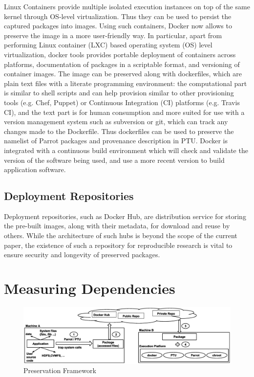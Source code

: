 Linux Containers provide multiple isolated execution instances on top of the same kernel through OS-level virtualization. Thus they can be used to persist the captured packages into images. Using such containers, Docker now allows to preserve the image in a more user-friendly way. In particular, apart from performing Linux container (LXC) based operating system (OS) level virtualization, docker tools provides portable deployment of containers across platforms, documentation of packages in a scriptable format, and versioning of container images. The image can be preserved along with dockerfiles, which are plain text files with a literate programming environment: the computational part is similar to shell scripts and can help provision similar to other provisioning tools (e.g. Chef, Puppet) or Continuous Integration (CI) platforms (e.g. Travis CI), and the text part is for human consumption and more suited for use with a version management system such as subversion or git, which can track any changes made to the Dockerfile. Thus dockerfiles can be used to preserve the namelist of Parrot packages and provenance description in PTU. 
Docker is integrated with a continuous build environment which will check and validate the version of the software being used, and use a more recent version to build application software. 


\subsection{Deployment  Repositories}
Deployment repositories, such as Docker Hub, are distribution service for storing the pre-built images, along with their metadata, for download and reuse by others. While the architecture of such hubs is beyond the scope of the current paper, the existence of such a repository for reproducible research is vital to ensure security and longevity of preserved packages. 

\section{Measuring Dependencies}

\begin{figure}
\centering
\includegraphics[width=.8\textwidth]{preservation_framework.eps}
\caption{Preservation Framework}
\label{fig: preservation_framework}
\end{figure}

